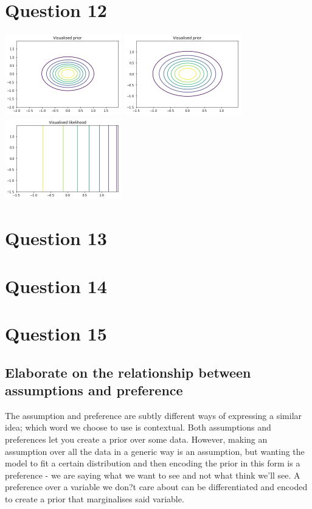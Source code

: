 \documentclass[a4paper, 9pt]{article}
\begin{document}
\section*{Question 12}

\includegraphics[width=2in,height=1.4in]{prior0} 
\includegraphics[width=2in,height=1.4in]{prior1}
\includegraphics[width=2in,height=1.4in]{likelihood1}  

\section*{Question 13}

\section*{Question 14}

\section*{Question 15}
\subsection*{Elaborate on the relationship between assumptions and preference}
The assumption and preference are subtly different ways of expressing a similar idea; which word we choose to use is contextual. Both assumptions and preferences let you create a prior over some data. However, making an assumption over all the data in a generic way is an assumption, but wanting the model to fit a certain distribution and then encoding the prior in this form is a preference - we are saying what we want to see and not what think we'll see. A preference over a variable we don?t care about can be differentiated and encoded to create a prior that marginalises said variable. 
\end{document}
